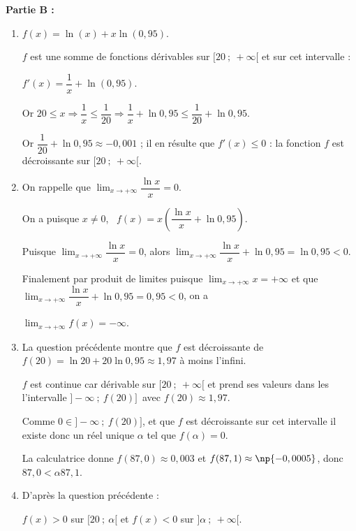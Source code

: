 \bigskip

\textbf{Partie B :}

\medskip

\begin{enumerate}
\item %

$f(x) = \ln (x) + x \ln (0,95)$.

$f$ est une somme de fonctions dérivables sur $[20~;~ +\infty[$ et sur cet intervalle :

$f'(x) = \dfrac{1}{x} + \ln (0,95)$.


Or $20 \leqslant x \Rightarrow \dfrac{1}{x} \leqslant \dfrac{1}{20} \Rightarrow \dfrac{1}{x} + \ln 0,95\leqslant \dfrac{1}{20} + \ln 0,95$.

Or $\dfrac{1}{20} + \ln 0,95 \approx - 0,001$ ; il en résulte que $f'(x) \leqslant 0$ : la fonction $f$ est décroissante sur $[20~;~ +\infty[$.
\item On rappelle que $\displaystyle\lim_{x \to + \infty} \dfrac{\ln x}{x} = 0$. 

On a puisque $x \ne 0$, \, $f(x) = x\left(\dfrac{\ln x}{x} + \ln 0,95 \right)$.

Puisque  $\displaystyle\lim_{x \to + \infty} \dfrac{\ln x}{x} = 0$, alors  $\displaystyle\lim_{x \to + \infty} \dfrac{\ln x}{x} + \ln 0,95 = \ln 0,95 < 0$.

Finalement par produit de limites puisque $\displaystyle\lim_{x \to + \infty} x = + \infty$ et que $\displaystyle\lim_{x \to + \infty} \dfrac{\ln x}{x} + \ln 0,95 = 0,95 < 0$, on a 

$\displaystyle\lim_{x \to + \infty}f(x) = - \infty$.
\item %
La question précédente montre que $f$ est décroissante de $f(20) = \ln 20 + 20\ln 0,95 \approx 1,97$ à moins l'infini.

$f$ est continue car dérivable sur $[20~;~ +\infty[$ et prend ses valeurs dans les l'intervalle 
$]- \infty~;~f(20)]$\, avec $f(20) \approx 1,97$.

Comme $0 \in ]- \infty~;~f(20)]$, et que $f$ est décroissante sur cet intervalle  il existe donc un réel unique $\alpha$ tel que $f(\alpha) = 0$.

La calculatrice donne $f(87,0) \approx 0,003$ et $f(87,1) \approx \np{- 0,0005}$, donc 
$87,0 < \alpha 87,1$.
\item %
D'après la question précédente :

$f(x) > 0$ sur $[20~;~\alpha[$ et $f(x) < 0$ sur $]\alpha~;~+ \infty[$. 
\end{enumerate}

